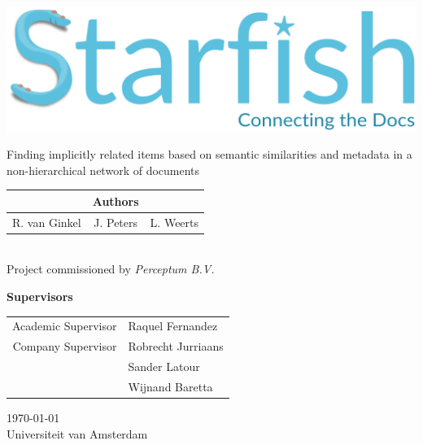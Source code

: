 \documentclass[a4paper]{article}
\begin{document}
\thispagestyle{empty}
\begin{center}
\includegraphics[width=\linewidth]{logo_starfish_project}\\\vspace{1cm}

{\large
Finding implicitly related items based on semantic similarities and metadata in a non-hierarchical network of documents
}\\\vspace{0.5cm}

\begin{tabular*}{0.8\linewidth}{@{\extracolsep{\fill}}lcr}
& \textbf{Authors} & \\
\hline
R. van Ginkel 	& J. Peters 	& L. Weerts \\
\end{tabular*}
\\\vspace{2cm}
Project commissioned by \emph{Perceptum B.V.}\\\vspace{1cm}

\textbf{Supervisors}\\
\begin{tabular}{r|l}
Academic Supervisor & Raquel Fernandez \\
Company Supervisor & Robrecht Jurriaans \\
& Sander Latour \\
& Wijnand Baretta
\end{tabular}


\vfill
\today\\
Universiteit van Amsterdam

\end{center}
\restoregeometry

\clearpage

\begin{abstract}

\end{abstract}
\end{document}
